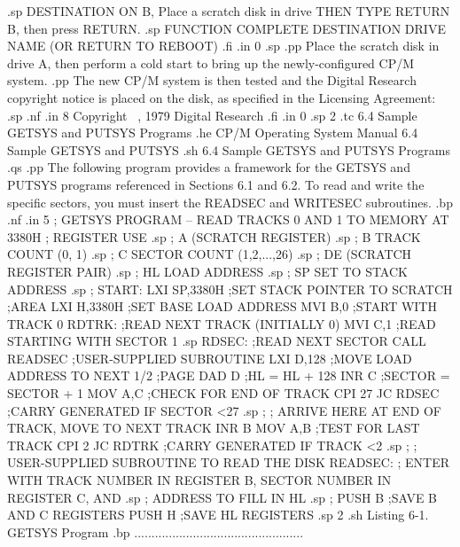 .sp
DESTINATION ON B,         Place a scratch disk in drive 
THEN TYPE RETURN          B, then press RETURN.
.sp
FUNCTION COMPLETE
DESTINATION DRIVE NAME
(OR RETURN TO REBOOT)
.fi
.in 0
.sp
.pp
Place the scratch disk in drive A, then 
perform a cold start to bring up the newly-configured CP/M 
system.
.pp
The new CP/M system is then tested and the Digital Research 
copyright notice is placed on the disk, as specified in the 
Licensing Agreement:
.sp
.nf
.in 8
Copyright  \ , 1979
 Digital Research
.fi
.in 0
.sp 2
.tc    6.4  Sample GETSYS and PUTSYS Programs
.he CP/M Operating System Manual        6.4  Sample GETSYS and PUTSYS 
.sh
6.4  Sample GETSYS and PUTSYS Programs
.qs
.pp
The following program provides a framework for the GETSYS and 
PUTSYS programs referenced in Sections 6.1 and 6.2.  To read and 
write the specific sectors, you must insert the READSEC and WRITESEC 
subroutines.
.bp
.nf
.in 5
;  GETSYS PROGRAM -- READ TRACKS 0 AND 1 TO MEMORY AT 3380H
;  REGISTER                    USE
.sp
;         A               (SCRATCH REGISTER)
.sp
;         B               TRACK COUNT (0, 1)
.sp
;         C               SECTOR COUNT (1,2,...,26)
.sp
;         DE              (SCRATCH REGISTER PAIR)
.sp
;         HL              LOAD ADDRESS
.sp     
;         SP              SET TO STACK ADDRESS
.sp
;
START:    LXI  SP,3380H   ;SET STACK POINTER TO SCRATCH
                          ;AREA
          LXI  H,3380H    ;SET BASE LOAD ADDRESS
          MVI  B,0        ;START WITH TRACK 0
RDTRK:                    ;READ NEXT TRACK (INITIALLY 0)
          MVI  C,1        ;READ STARTING WITH SECTOR 1
.sp
RDSEC:                    ;READ NEXT SECTOR
          CALL READSEC    ;USER-SUPPLIED SUBROUTINE
          LXI  D,128      ;MOVE LOAD ADDRESS TO NEXT 1/2
                          ;PAGE
          DAD  D          ;HL = HL + 128
          INR  C          ;SECTOR = SECTOR + 1
          MOV  A,C        ;CHECK FOR END OF TRACK
          CPI  27
          JC   RDSEC      ;CARRY GENERATED IF SECTOR <27
.sp
;       
;  ARRIVE HERE AT END OF TRACK, MOVE TO NEXT TRACK
          INR  B
          MOV  A,B        ;TEST FOR LAST TRACK
          CPI  2
          JC   RDTRK      ;CARRY GENERATED IF TRACK <2
.sp
;
;  USER-SUPPLIED SUBROUTINE TO READ THE DISK
READSEC:
;  ENTER WITH TRACK NUMBER IN REGISTER B,
          SECTOR NUMBER IN REGISTER C, AND
.sp
;         ADDRESS TO FILL IN HL
.sp
;
          PUSH B          ;SAVE B AND C REGISTERS
          PUSH H          ;SAVE HL REGISTERS
.sp 2
.sh
                  Listing 6-1.  GETSYS Program
.bp
          .................................................
